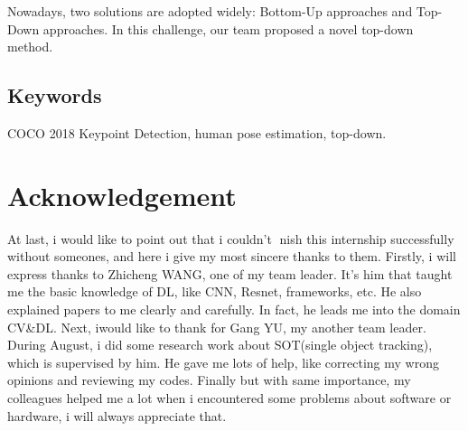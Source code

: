 \documentclass[oneside]{memoir}
\begin{document}
Nowadays, two solutions are adopted widely: Bottom-Up approaches and Top-Down approaches. In this challenge, our team proposed a novel top-down method.


\section*{Keywords}
COCO 2018 Keypoint Detection, human pose estimation, top-down.


\setcounter{page}{1}







\chapter*{Acknowledgement}
At last, i would like to point out that i couldn’t nish this internship
successfully without someones, and here i give my most sincere thanks to them.
Firstly, i will express thanks to Zhicheng WANG, one of my team leader. It’s him
that taught me the basic knowledge of DL, like CNN, Resnet, frameworks, etc. He
also explained papers to me clearly and carefully. In fact, he leads me into the domain
CV&DL.
Next, iwould like to thank for Gang YU, my another team leader. During August,
i did some research work about SOT(single object tracking), which is supervised by
him. He gave me lots of help, like correcting my wrong opinions and reviewing my
codes.
Finally but with same importance, my colleagues helped me a lot when i encountered
some problems about software or hardware, i will always appreciate that.




\appendix

% 
\end{document}
